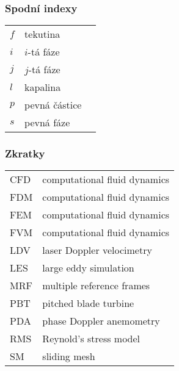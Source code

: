 \subsubsection*{Spodní indexy}
\begin{tabularx}{\textwidth}{@{}p{1.0cm} X r@{}}

$f$ & tekutina & \\
$i$ & $i$-tá fáze & \\
$j$ & $j$-tá fáze & \\
$l$ & kapalina & \\
$p$ & pevná částice & \\
$s$ & pevná fáze & \\
\end{tabularx}

\subsubsection*{Zkratky}
\begin{tabularx}{\textwidth}{@{}p{1.0cm} X }
	
CFD & computational fluid dynamics  \\
FDM & computational fluid dynamics  \\
FEM & computational fluid dynamics  \\
FVM & computational fluid dynamics  \\
LDV & laser Doppler velocimetry  \\
LES & large eddy simulation \\
MRF & multiple reference frames \\
PBT & pitched blade turbine \\
PDA & phase Doppler anemometry \\
RMS & Reynold's stress model\\
SM & sliding mesh
\end{tabularx}
